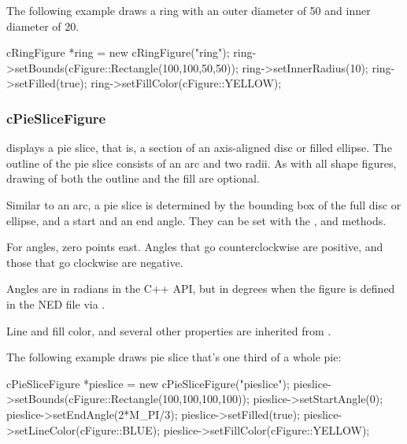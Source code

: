 The following example draws a ring with an outer diameter of 50 and
inner diameter of 20.

\begin{cpp}
cRingFigure *ring = new cRingFigure("ring");
ring->setBounds(cFigure::Rectangle(100,100,50,50));
ring->setInnerRadius(10);
ring->setFilled(true);
ring->setFillColor(cFigure::YELLOW);
\end{cpp}


\begin{center}

\end{center}


\subsubsection{cPieSliceFigure}
\label{sec:graphics:pieslicefigure}

 displays a pie slice, that is, a section of an
axis-aligned disc or filled ellipse.  The outline of the pie slice consists
of an arc and two radii. As with all shape figures, drawing of both the
outline and the fill are optional.

Similar to an arc, a pie slice is determined by the bounding box of the
full disc or ellipse, and a start and an end angle. They can be set with
the ,  and 
methods.

For angles, zero points east. Angles that go counterclockwise are
positive, and those that go clockwise are negative.

\begin{note}
Angles are in radians in the C++ API, but in degrees when the figure is
defined in the NED file via .
\end{note}

Line and fill color, and several other properties are inherited from
.

The following example draws pie slice that's one third of a whole pie:

\begin{cpp}
cPieSliceFigure *pieslice = new cPieSliceFigure("pieslice");
pieslice->setBounds(cFigure::Rectangle(100,100,100,100));
pieslice->setStartAngle(0);
pieslice->setEndAngle(2*M_PI/3);
pieslice->setFilled(true);
pieslice->setLineColor(cFigure::BLUE);
pieslice->setFillColor(cFigure::YELLOW);
\end{cpp}

